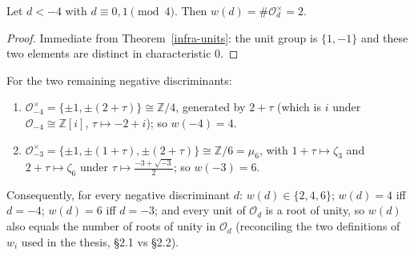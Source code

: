 \begin{corollary}[$w(d) = 2$ for $d < -4$]\label{infra-units-card}
  \leanok
  Let $d < -4$ with $d \equiv 0, 1 \pmod 4$. Then $w(d) = \#\mathcal{O}_d^\times = 2$.
\end{corollary}

\begin{proof}
  Immediate from Theorem~\ref{infra-units}: the unit group is $\{1, -1\}$ and
  these two elements are distinct in characteristic $0$.
\end{proof}

\begin{proposition}\label{infra-units-torsion}
  For the two remaining negative discriminants:
  \begin{enumerate}
    \item $\mathcal{O}_{-4}^\times = \{\pm 1, \pm(2+\tau)\} \cong \mathbb{Z}/4$,
      generated by $2+\tau$ (which is $i$ under
      $\mathcal{O}_{-4} \cong \mathbb{Z}[i]$, $\tau \mapsto -2+i$); so $w(-4) = 4$.
    \item $\mathcal{O}_{-3}^\times = \{\pm 1, \pm(1+\tau), \pm(2+\tau)\} \cong \mathbb{Z}/6
      = \mu_6$, with $1+\tau \mapsto \zeta_3$ and $2+\tau \mapsto \zeta_6$ under
      $\tau \mapsto \tfrac{-3+\sqrt{-3}}{2}$; so $w(-3) = 6$.
  \end{enumerate}
  Consequently, for every negative discriminant $d$:
  $w(d) \in \{2, 4, 6\}$; $w(d) = 4$ iff $d = -4$; $w(d) = 6$ iff $d = -3$; and
  every unit of $\mathcal{O}_d$ is a root of unity, so $w(d)$ also equals the
  number of roots of unity in $\mathcal{O}_d$ (reconciling the two definitions of
  $w_i$ used in the thesis, \S2.1 vs \S2.2).
\end{proposition}

